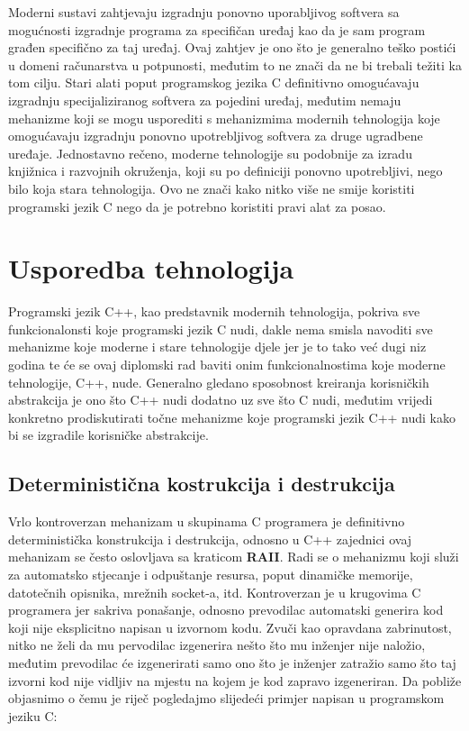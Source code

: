 Moderni sustavi zahtjevaju izgradnju ponovno uporabljivog softvera sa mogućnosti izgradnje programa za specifičan uređaj kao da je sam program građen specifično za taj uređaj. Ovaj zahtjev je ono što je generalno teško postići u domeni računarstva u potpunosti, međutim to ne znači da ne bi trebali težiti ka tom cilju. Stari alati poput programskog jezika C definitivno omogućavaju izgradnju specijaliziranog softvera za pojedini uređaj, međutim nemaju mehanizme koji se mogu usporediti s mehanizmima modernih tehnologija koje omogućavaju izgradnju ponovno upotrebljivog softvera za druge ugradbene uređaje. Jednostavno rečeno, moderne tehnologije su podobnije za izradu knjižnica i razvojnih okruženja, koji su po definiciji ponovno upotrebljivi, nego bilo koja stara tehnologija. Ovo ne znači kako nitko više ne smije koristiti programski jezik C nego da je potrebno koristiti pravi alat za posao. 

\section{Usporedba tehnologija}
Programski jezik C++, kao predstavnik modernih tehnologija, pokriva sve funkcionalonsti koje programski jezik C nudi, dakle nema smisla navoditi sve mehanizme koje moderne i stare tehnologije djele jer je to tako već dugi niz godina te će se ovaj diplomski rad baviti onim funkcionalnostima koje moderne tehnologije, C++, nude. Generalno gledano sposobnost kreiranja korisničkih abstrakcija je ono što C++ nudi dodatno uz sve što C nudi, međutim vrijedi konkretno prodiskutirati točne mehanizme koje programski jezik C++ nudi kako bi se izgradile korisničke abstrakcije. 

\subsection{Deterministična kostrukcija i destrukcija}
Vrlo kontroverzan mehanizam u skupinama C programera je definitivno deterministička konstrukcija i destrukcija, odnosno u C++ zajednici ovaj mehanizam se često oslovljava sa kraticom \textbf{RAII}. Radi se o mehanizmu koji služi za automatsko stjecanje i odpuštanje resursa, poput dinamičke memorije, datotečnih opisnika, mrežnih socket-a, itd. Kontroverzan je u krugovima C programera jer sakriva ponašanje, odnosno prevodilac automatski generira kod koji nije eksplicitno napisan u izvornom kodu. Zvuči kao opravdana zabrinutost, nitko ne želi da mu pervodilac izgenerira nešto što mu inženjer nije naložio, međutim prevodilac će izgenerirati samo ono što je inženjer zatražio samo što taj izvorni kod nije vidljiv na mjestu na kojem je kod zapravo izgeneriran. Da pobliže objasnimo o čemu je riječ pogledajmo slijedeći primjer napisan u programskom jeziku C:


